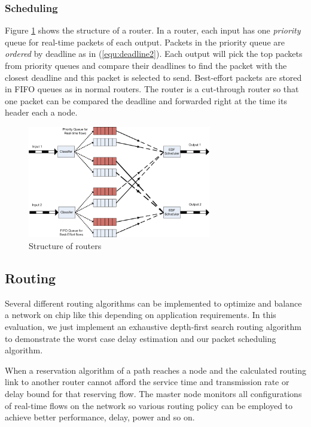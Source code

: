 \documentclass[conference, twocolumn]{IEEEtran}
\theoremstyle{definition}
\begin{document}
\subsubsection{Scheduling}
Figure \ref{fig:RouterStructure} shows the structure of a router. In a router,
each input has one {\em priority} queue for real-time packets of each output.
Packets in the priority queue are {\em ordered} by deadline as in
(\ref{equ:deadline2}). Each output will pick the top packets from priority
queues and compare their deadlines to find the packet with the closest deadline
and this packet is selected to send. Best-effort packets are stored in FIFO queues as in
normal routers. The router is a cut-through router so that one packet can be
compared the deadline and forwarded right at the time its header each a node.

\begin{figure}[htp]
\centering
\includegraphics[width=8cm]{pics/Router.png}
\caption[Other Spec.]
{Structure of routers}\label{fig:RouterStructure}
\end{figure}

\subsection{Routing}

Several different routing algorithms can be implemented to optimize and balance
a network on chip like this depending on application requirements. In this
evaluation, we just implement an exhaustive depth-first search routing algorithm
to demonstrate the worst case delay estimation and our packet scheduling algorithm.

When a reservation algorithm of a path reaches a node and the calculated routing
link to another router cannot afford the service time and transmission rate or delay 
bound for that reserving flow. The master node monitors all configurations of
real-time flows on the network so various routing policy can be employed to
achieve better performance, delay, power and so on.
\end{document}
